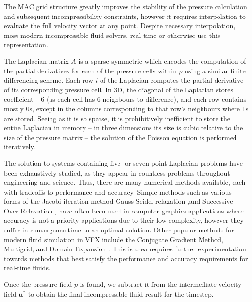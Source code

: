 \documentclass[a4paper, 11pt, titlepage]{article}
\begin{document}
The MAC grid structure greatly improves the stability of the pressure calculation
and subsequent incompressibility constraints,
however it requires interpolation to evaluate the full velocity vector at any
point. Despite necessary interpolation, most modern incompressible fluid solvers, real-time or
otherwise use this representation.

The Laplacian matrix $A$ is a sparse symmetric which encodes the computation of the partial derivatives for
each of the pressure cells within $p$ using a similar finite differencing
scheme. Each row $i$ of the Laplacian computes the partial derivative of its
corresponding pressure cell. In 3D, the diagonal of the Laplacian stores
coefficient $-6$ (as each cell has 6 neighbours to difference), and each row
contains mostly 0s, except in the columns corresponding to that row's neighbours
where 1s are stored. Seeing as it is so sparse, it is prohibitively inefficient
to store the entire Laplacian in memory -- in three dimensions its size is cubic relative to
the size of the pressure matrix -- the solution of the Poisson equation is
performed iteratively.

The solution to systems containing five- or seven-point Laplacian problems have been
exhaustively studied, as they appear in countless problems throughout engineering
and science. Thus, there are many numerical methods available, each with tradeoffs to
performance and accuracy. Simple methods such as various forms of the Jacobi iteration method
\cite{gomes2009linear} Gauss-Seidel relaxation \cite{gomes2009linear},and
Successive Over-Relaxation \cite{hadjidimos2000successive}, have
often been used in computer graphics applications where accuracy is not a priority
applications due to their low complexity, however
they suffer in convergence time to an optimal solution. Other popular methods
for modern fluid simulation in VFX
include the Conjugate Gradient Method, Multigrid, and Domain
Expansion \cite{bridsonbook}. This is area requires further experimentation towards methods
that best satisfy the performance and accuracy requirements for real-time
fluids.

Once the pressure field $p$ is found, we subtract it from the intermediate
velocity field $\bm{u}^*$ to obtain the final incompressible fluid result for
the timestep.
\end{document}
